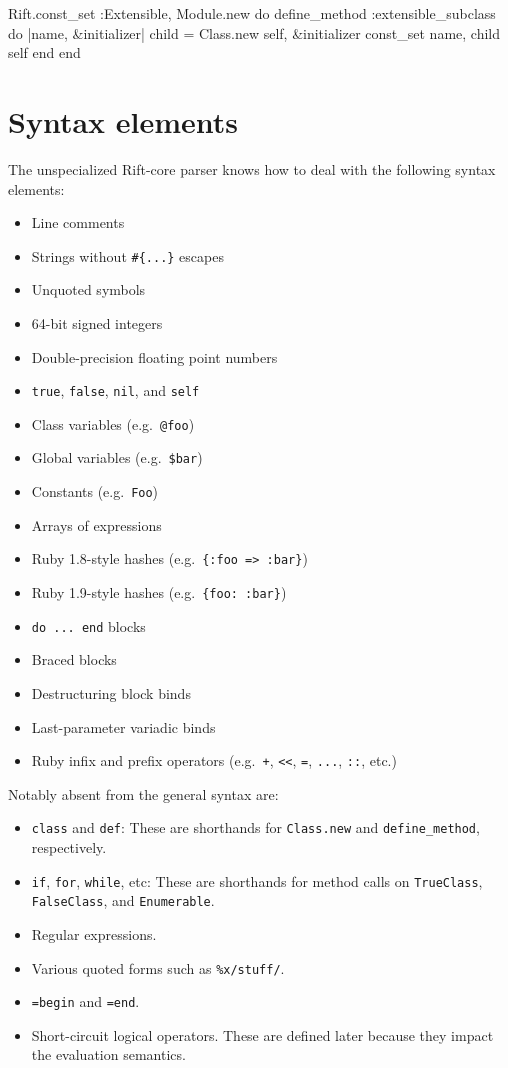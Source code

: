 \documentclass{report}
\begin{document}
\begin{rubycode}
Rift.const_set :Extensible, Module.new do
  define_method :extensible_subclass do |name, &initializer|
    child = Class.new self, &initializer
    const_set name, child
    self
  end
end \end{rubycode}

\section{Syntax elements}
    The unspecialized Rift-core parser knows how to deal with the following syntax elements:

\begin{itemize}
\item{Line comments}
\item{Strings without {\tt \#\{...\}} escapes}
\item{Unquoted symbols}
\item{64-bit signed integers}
\item{Double-precision floating point numbers}
\item{{\tt true}, {\tt false}, {\tt nil}, and {\tt self}}
\item{Class variables (e.g.~{\tt @foo})}
\item{Global variables (e.g.~{\tt \$bar})}
\item{Constants (e.g.~{\tt Foo})}
\item{Arrays of expressions}
\item{Ruby 1.8-style hashes (e.g.~{\tt \{:foo => :bar\}})}
\item{Ruby 1.9-style hashes (e.g.~{\tt \{foo:~:bar\}})}
\item{{\tt do ... end} blocks}
\item{Braced blocks}
\item{Destructuring block binds}
\item{Last-parameter variadic binds}
\item{Ruby infix and prefix operators (e.g.~{\tt +}, {\tt <<}, {\tt =}, {\tt ...}, {\tt ::}, etc.)}
\end{itemize}

    Notably absent from the general syntax are:

\begin{itemize}
\item{{\tt class} and {\tt def}: These are shorthands for {\tt Class.new} and {\tt define\_method}, respectively.}
\item{{\tt if}, {\tt for}, {\tt while}, etc: These are shorthands for method calls on {\tt TrueClass}, {\tt FalseClass}, and {\tt Enumerable}.}
\item{Regular expressions.}
\item{Various quoted forms such as {\tt \%x/stuff/}.}
\item{{\tt =begin} and {\tt =end}.}
\item{Short-circuit logical operators. These are defined later because they impact the evaluation semantics.}
\end{itemize}
\end{document}
